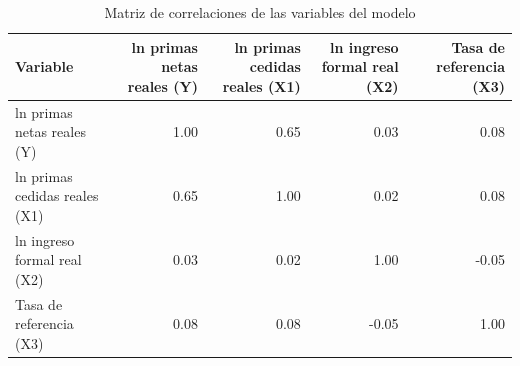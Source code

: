 \begin{table}[htbp]
\caption{Matriz de correlaciones de las variables del modelo}
\label{tab:tabla_3_correlaciones}
\begin{tabular}{lrrrr}
\toprule
Variable & ln primas netas reales (Y) & ln primas cedidas reales (X1) & ln ingreso formal real (X2) & Tasa de referencia (X3) \\
\midrule
ln primas netas reales (Y) & 1.00 & 0.65 & 0.03 & 0.08 \\
ln primas cedidas reales (X1) & 0.65 & 1.00 & 0.02 & 0.08 \\
ln ingreso formal real (X2) & 0.03 & 0.02 & 1.00 & -0.05 \\
Tasa de referencia (X3) & 0.08 & 0.08 & -0.05 & 1.00 \\
\bottomrule
\end{tabular}
\par{}
\end{table}
